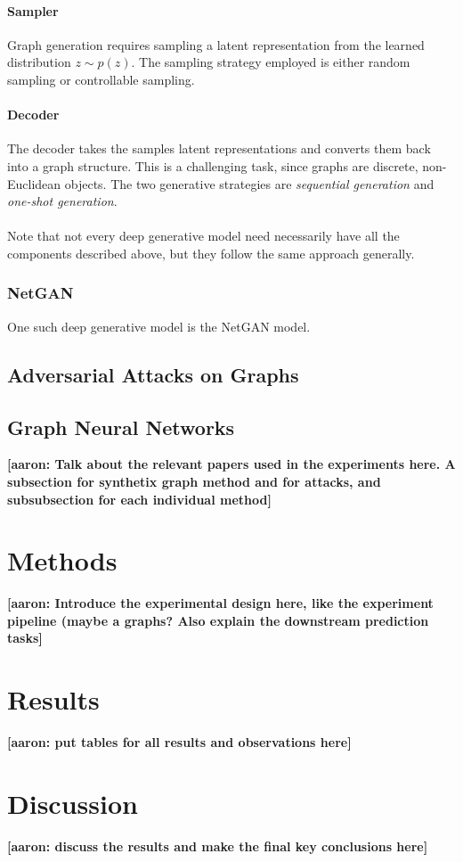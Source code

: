 \documentclass{article}
\newcommand{\aaron}[2]{{\color{orange}\bfseries [aaron: #1]}}
\begin{document}
\paragraph{Sampler} Graph generation requires sampling a latent representation from the learned distribution $z \sim p(z)$. The sampling strategy employed is either random sampling or controllable sampling. 

\paragraph{Decoder} The decoder takes the samples latent representations and converts them back into a graph structure. This is a challenging task, since graphs are discrete, non-Euclidean objects. The two generative strategies are \emph{sequential generation} and \emph{one-shot generation}.
\\
\\
Note that not every deep generative model need necessarily have all the components described above, but they follow the same approach generally. 

\subsubsection{NetGAN}

One such deep generative model is the NetGAN \cite{bojchevski2018netgan} model. 



\subsection{Adversarial Attacks on Graphs}



\subsection{Graph Neural Networks}


\aaron{Talk about the relevant papers used in the experiments here. A subsection for synthetix graph method and for attacks, and subsubsection for each individual method}{}

\section{Methods}
\label{Methods}
\aaron{Introduce the experimental design here, like the experiment pipeline (maybe a graphs? Also explain the downstream prediction tasks}{}

\section{Results}
\label{Results}
\aaron{put tables for all results and observations here}{}

\section{Discussion}
\label{Discussion}
\aaron{discuss the results and make the final key conclusions here}{}


\nocite{*}


\end{document}
